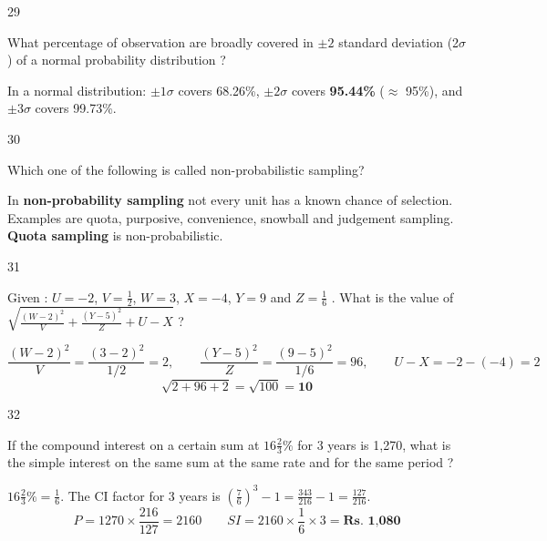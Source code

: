 \begin{question}{29}
{What percentage of observation are broadly covered in $\pm2$ standard deviation (2$\sigma$) of a normal probability distribution ?\par}
\begin{explain}
In a normal distribution: $\pm1\sigma$ covers 68.26\%, $\pm2\sigma$ covers \textbf{95.44\%} ($\approx$ 95\%), and $\pm3\sigma$ covers 99.73\%.
\end{explain}
\end{question}

\begin{question}{30}
{Which one of the following is called non-probabilistic sampling?\par}
\begin{explain}
In \textbf{non-probability sampling} not every unit has a known chance of selection. Examples are quota, purposive, convenience, snowball and judgement sampling. \textbf{Quota sampling} is non-probabilistic.
\end{explain}
\end{question}

\begin{question}{31}
{Given : $U=-2$, $V=\frac{1}{2}$, $W=3$, $X=-4$, $Y=9$ and $Z=\frac{1}{6}$ . What is the value of $\sqrt{\frac{(W-2)^{2}}{V}+\frac{(Y-5)^{2}}{Z}+U-X}$ ?\par}
\begin{explain}
\[\frac{(W-2)^2}{V}=\frac{(3-2)^2}{1/2}=2,\qquad \frac{(Y-5)^2}{Z}=\frac{(9-5)^2}{1/6}=96,\qquad U-X=-2-(-4)=2\]
\[\sqrt{2+96+2}=\sqrt{100}=\mathbf{10}\]
\end{explain}
\end{question}

\begin{question}{32}
{If the compound interest on a certain sum at $16\frac{2}{3}\%$ for 3 years is 1,270, what is the simple interest on the same sum at the same rate and for the same period ?\par}
\begin{explain}
$16\tfrac23\%=\tfrac16$. The CI factor for 3 years is $\left(\tfrac76\right)^3-1=\tfrac{343}{216}-1=\tfrac{127}{216}$.
\[P=1270\times\frac{216}{127}=2160\qquad SI=2160\times\frac16\times3=\textbf{Rs.\ 1{,}080}\]
\end{explain}
\end{question}

